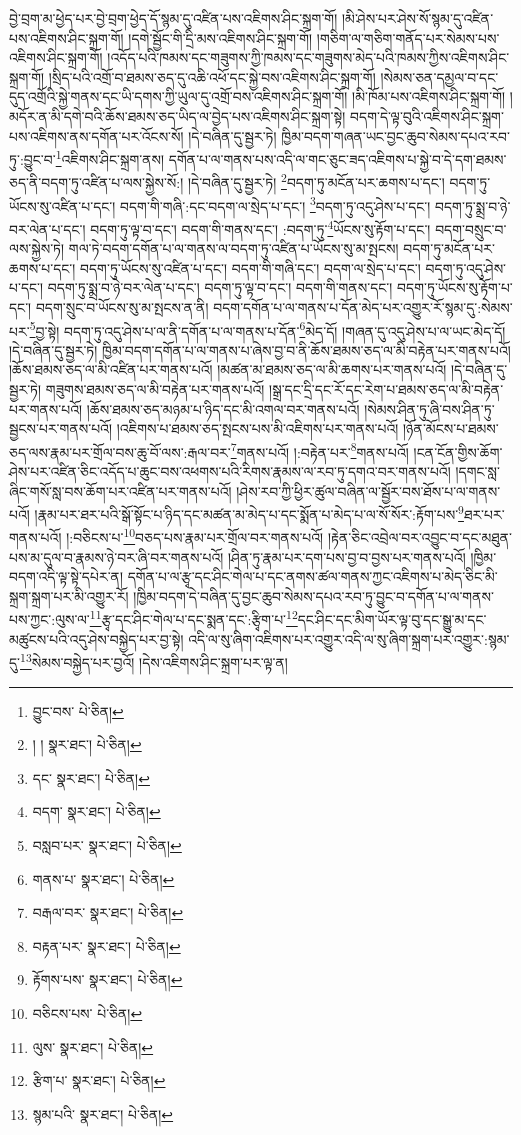 བྱེ་བྲག་མ་ཕྱེད་པར་བྱེ་བྲག་ཕྱེད་དོ་སྙམ་དུ་འཛིན་པས་འཇིགས་ཤིང་སྐྲག་གོ། །མི་ཤེས་པར་ཤེས་སོ་སྙམ་དུ་འཛིན་པས་འཇིགས་ཤིང་སྐྲག་གོ། །དགེ་སྦྱོང་གི་དྲི་མས་འཇིགས་ཤིང་སྐྲག་གོ། །གཅིག་ལ་གཅིག་གནོད་པར་སེམས་པས་འཇིགས་ཤིང་སྐྲག་གོ། །འདོད་པའི་ཁམས་དང་གཟུགས་ཀྱི་ཁམས་དང་གཟུགས་མེད་པའི་ཁམས་ཀྱིས་འཇིགས་ཤིང་སྐྲག་གོ། །སྲིད་པའི་འགྲོ་བ་ཐམས་ཅད་དུ་འཆི་འཕོ་དང་སྐྱེ་བས་འཇིགས་ཤིང་སྐྲག་གོ། །སེམས་ཅན་དམྱལ་བ་དང་དུད་འགྲོའི་སྐྱེ་གནས་དང་ཡི་དགས་ཀྱི་ཡུལ་དུ་འགྲོ་བས་འཇིགས་ཤིང་སྐྲག་གོ། །མི་ཁོམ་པས་འཇིགས་ཤིང་སྐྲག་གོ། །མདོར་ན་མི་དགེ་བའི་ཆོས་ཐམས་ཅད་ཡིད་ལ་བྱེད་པས་འཇིགས་ཤིང་སྐྲག་སྟེ། བདག་དེ་ལྟ་བུའི་འཇིགས་ཤིང་སྐྲག་པས་འཇིགས་ནས་དགོན་པར་འོངས་སོ། །དེ་བཞིན་དུ་སྦྱར་ཏེ། ཁྱིམ་བདག་གཞན་ཡང་བྱང་ཆུབ་སེམས་དཔའ་རབ་ཏུ་:བྱུང་བ་\footnote{བྱུང་བས་  པེ་ཅིན། }འཇིགས་ཤིང་སྐྲག་ནས། དགོན་པ་ལ་གནས་པས་འདི་ལ་གང་ཅུང་ཟད་འཇིགས་པ་སྐྱེ་བ་དེ་དག་ཐམས་ཅད་ནི་བདག་ཏུ་འཛིན་པ་ལས་སྐྱེས་སོ:། །དེ་བཞིན་དུ་སྦྱར་ཏེ། \footnote{། །   སྣར་ཐང་།  པེ་ཅིན། }བདག་ཏུ་མངོན་པར་ཆགས་པ་དང་། བདག་ཏུ་ཡོངས་སུ་འཛིན་པ་དང་། བདག་གི་གཞི་:དང་བདག་ལ་སྲེད་པ་དང་། \footnote{དང་  སྣར་ཐང་།  པེ་ཅིན། }བདག་ཏུ་འདུ་ཤེས་པ་དང་། བདག་ཏུ་སྨྲ་བ་ཉེ་བར་ལེན་པ་དང་། བདག་ཏུ་ལྟ་བ་དང་། བདག་གི་གནས་དང་། :བདག་ཏུ་\footnote{བདག་  སྣར་ཐང་།  པེ་ཅིན། }ཡོངས་སུ་རྟོག་པ་དང་། བདག་བསྲུང་བ་ལས་སྐྱེས་ཏེ། གལ་ཏེ་བདག་དགོན་པ་ལ་གནས་ལ་བདག་ཏུ་འཛིན་པ་ཡོངས་སུ་མ་སྤངས། བདག་ཏུ་མངོན་པར་ཆགས་པ་དང་། བདག་ཏུ་ཡོངས་སུ་འཛིན་པ་དང་། བདག་གི་གཞི་དང་། བདག་ལ་སྲེད་པ་དང་། བདག་ཏུ་འདུ་ཤེས་པ་དང་། བདག་ཏུ་སྨྲ་བ་ཉེ་བར་ལེན་པ་དང་། བདག་ཏུ་ལྟ་བ་དང་། བདག་གི་གནས་དང་། བདག་ཏུ་ཡོངས་སུ་རྟོག་པ་དང་། བདག་སྲུང་བ་ཡོངས་སུ་མ་སྤངས་ན་ནི། བདག་དགོན་པ་ལ་གནས་པ་དོན་མེད་པར་འགྱུར་རོ་སྙམ་དུ་:སེམས་པར་\footnote{བསླབ་པར་  སྣར་ཐང་།  པེ་ཅིན། }བྱ་སྟེ། བདག་ཏུ་འདུ་ཤེས་པ་ལ་ནི་དགོན་པ་ལ་གནས་པ་དོན་\footnote{གནས་པ་  སྣར་ཐང་།  པེ་ཅིན། }མེད་དོ། །གཞན་དུ་འདུ་ཤེས་པ་ལ་ཡང་མེད་དོ། །དེ་བཞིན་དུ་སྦྱར་ཏེ། ཁྱིམ་བདག་དགོན་པ་ལ་གནས་པ་ཞེས་བྱ་བ་ནི་ཆོས་ཐམས་ཅད་ལ་མི་བརྟེན་པར་གནས་པའོ། །ཆོས་ཐམས་ཅད་ལ་མི་འཛིན་པར་གནས་པའོ། །མཚན་མ་ཐམས་ཅད་ལ་མི་ཆགས་པར་གནས་པའོ། །དེ་བཞིན་དུ་སྦྱར་ཏེ། གཟུགས་ཐམས་ཅད་ལ་མི་བརྟེན་པར་གནས་པའོ། །སྒྲ་དང་དྲི་དང་རོ་དང་རེག་པ་ཐམས་ཅད་ལ་མི་བརྟེན་པར་གནས་པའོ། །ཆོས་ཐམས་ཅད་མཉམ་པ་ཉིད་དང་མི་འགལ་བར་གནས་པའོ། །སེམས་ཤིན་ཏུ་ཞི་བས་ཤིན་ཏུ་སྦྱངས་པར་གནས་པའོ། །འཇིགས་པ་ཐམས་ཅད་སྤངས་པས་མི་འཇིགས་པར་གནས་པའོ། །ཉོན་མོངས་པ་ཐམས་ཅད་ལས་རྣམ་པར་གྲོལ་བས་ཆུ་བོ་ལས་:རྒལ་བར་\footnote{བརྒལ་བར་  སྣར་ཐང་།  པེ་ཅིན། }གནས་པའོ། །:བརྟེན་པར་\footnote{བརྟན་པར་  སྣར་ཐང་།  པེ་ཅིན། }གནས་པའོ། །ངན་ངོན་གྱིས་ཆོག་ཤེས་པར་འཛིན་ཅིང་འདོད་པ་ཆུང་བས་འཕགས་པའི་རིགས་རྣམས་ལ་རབ་ཏུ་དགའ་བར་གནས་པའོ། །དགང་སླ་ཞིང་གསོ་སླ་བས་ཆོག་པར་འཛིན་པར་གནས་པའོ། །ཤེས་རབ་ཀྱི་ཕྱིར་ཚུལ་བཞིན་ལ་སྦྱོར་བས་ཐོས་པ་ལ་གནས་པའོ། །རྣམ་པར་ཐར་པའི་སྒོ་སྟོང་པ་ཉིད་དང་མཚན་མ་མེད་པ་དང་སྨོན་པ་མེད་པ་ལ་སོ་སོར་:རྟོག་པས་\footnote{རྟོགས་པས་  སྣར་ཐང་།  པེ་ཅིན། }ཐར་པར་གནས་པའོ། །:བཅིངས་པ་\footnote{བཅིངས་པས་  པེ་ཅིན། }བཅད་པས་རྣམ་པར་གྲོལ་བར་གནས་པའོ། །རྟེན་ཅིང་འབྲེལ་བར་འབྱུང་བ་དང་མཐུན་པས་མ་དུལ་བ་རྣམས་ཉེ་བར་ཞི་བར་གནས་པའོ། །ཤིན་ཏུ་རྣམ་པར་དག་པས་བྱ་བ་བྱས་པར་གནས་པའོ། །ཁྱིམ་བདག་འདི་ལྟ་སྟེ་དཔེར་ན། དགོན་པ་ལ་རྩྭ་དང་ཤིང་གེལ་པ་དང་ནགས་ཚལ་གནས་ཀྱང་འཇིགས་པ་མེད་ཅིང་མི་སྐྲག་སྐྲག་པར་མི་འགྱུར་རོ། །ཁྱིམ་བདག་དེ་བཞིན་དུ་བྱང་ཆུབ་སེམས་དཔའ་རབ་ཏུ་བྱུང་བ་དགོན་པ་ལ་གནས་པས་ཀྱང་:ལུས་ལ་\footnote{ལུས་  སྣར་ཐང་།  པེ་ཅིན། }རྩྭ་དང་ཤིང་གེལ་པ་དང་སྨན་དང་:རྩྭིག་པ་\footnote{རྩིག་པ་  སྣར་ཐང་།  པེ་ཅིན། }དང་ཤིང་དང་མིག་ཡོར་ལྟ་བུ་དང་སྒྱུ་མ་དང་མཚུངས་པའི་འདུ་ཤེས་བསྐྱེད་པར་བྱ་སྟེ། འདི་ལ་སུ་ཞིག་འཇིགས་པར་འགྱུར་འདི་ལ་སུ་ཞིག་སྐྲག་པར་འགྱུར་:སྙམ་དུ་\footnote{སྙམ་པའི་  སྣར་ཐང་།  པེ་ཅིན། }སེམས་བསྐྱེད་པར་བྱའོ། །དེས་འཇིགས་ཤིང་སྐྲག་པར་ལྟ་ན། 